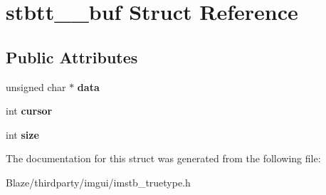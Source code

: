 \hypertarget{structstbtt____buf}{}\section{stbtt\+\_\+\+\_\+buf Struct Reference}
\label{structstbtt____buf}
\subsection*{Public Attributes}
\begin{DoxyCompactItemize}
\item 
\mbox{\label{structstbtt____buf_a376d8cdacbc8295a7e88567ad52a0ac4}} 
unsigned char $\ast$ {\bfseries data}
\item 
\mbox{\label{structstbtt____buf_ac047fda650726920531272c28aa354fb}} 
int {\bfseries cursor}
\item 
\mbox{\label{structstbtt____buf_a0f6f2d06981ab4a5697233bbd0cafb5b}} 
int {\bfseries size}
\end{DoxyCompactItemize}


The documentation for this struct was generated from the following file\+:\begin{DoxyCompactItemize}
\item 
Blaze/thirdparty/imgui/imstb\+\_\+truetype.\+h\end{DoxyCompactItemize}
